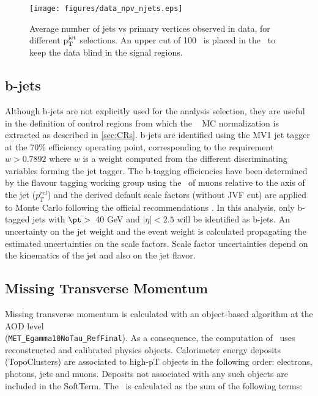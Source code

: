  \begin{figure*}[ht!]
 \centering
   \texttt{[image: figures/data\_npv\_njets.eps]}
 \caption{Average number of jets vs primary vertices observed in data, for different ${\rm p_{T}^{jet}}$ selections. An upper cut of 100 \gev\ is placed in the \etmiss\ to keep the data blind in the signal regions. }
\label{fig:NjetvsPV}
\end{figure*}


\subsection{b-jets}
\label{sec:bjet_obj}

Although b-jets are not explicitly used for the analysis selection, they are useful in the definition of control regions
from which the \wgamma\ %
MC normalization is extracted as described in \Sec \ref{sec:CRs}. b-jets are identified using
the MV1 jet tagger \cite{ATLAS-CONF-2012-043} at the 70\% efficiency operating point, corresponding
to the requirement $w > 0.7892$ where $w$ is a weight computed from the different discriminating
variables forming the jet tagger. The b-tagging efficiencies have been determined by the flavour
tagging working group using the \pt\ of muons relative to the axis of the jet ($p_{T}^{rel}$) \cite{ATLAS-CONF-2012-043} and the
derived default scale factors (without JVF cut) are applied to Monte Carlo following the official recommendations \cite{bjetsCalib}.
In this analysis, only b-tagged jets with $\pt >$~40 GeV and $|\eta| < 2.5$ will be identified as b-jets.
An uncertainty on the jet weight and the event weight is calculated propagating the estimated uncertainties
on the scale factors. Scale factor uncertainties depend on the kinematics of the jet and also on the jet flavor.

\subsection{Missing Transverse Momentum}
\label{sec:met_obj}

Missing transverse momentum is calculated with an object-based algorithm at the AOD level \\ (\texttt{MET\_Egamma10NoTau\_RefFinal}). As a consequence, the computation of \met\ uses reconstructed and calibrated physics objects. Calorimeter energy
deposits (TopoClusters) are associated to high-pT objects in the following order: electrons, photons, jets and muons. Deposits not associated with any such objects are included in the SoftTerm. The \met\ is calculated as the sum of the following terms:

